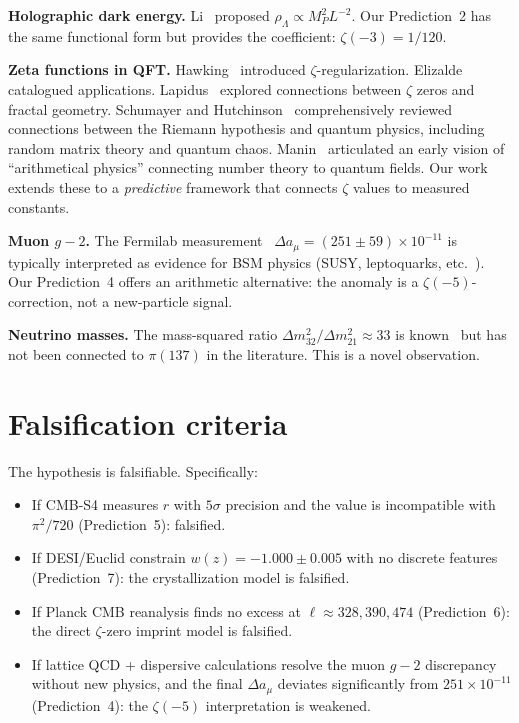 \documentclass[11pt,a4paper]{article}
\begin{document}
\textbf{Holographic dark energy.}
Li~\cite{Li2004} proposed $\rho_\Lambda \propto M_P^2 L^{-2}$.
Our Prediction~2 has the same functional form but provides
the coefficient: $\zeta(-3) = 1/120$.

\textbf{Zeta functions in QFT.}
Hawking~\cite{Hawking1977} introduced $\zeta$-regularization.
Elizalde~\cite{Elizalde2012} catalogued applications.
Lapidus~\cite{Lapidus2008} explored connections between
$\zeta$ zeros and fractal geometry.
Schumayer and Hutchinson~\cite{Schumayer2011} comprehensively
reviewed connections between the Riemann hypothesis and
quantum physics, including random matrix theory and quantum chaos.
Manin~\cite{Manin1989} articulated an early vision of
``arithmetical physics'' connecting number theory to quantum fields.
Our work extends these to a \emph{predictive} framework
that connects $\zeta$ values to measured constants.

\textbf{Muon $g-2$.}
The Fermilab measurement~\cite{Muong2_2021}
$\Delta a_\mu = (251 \pm 59) \times 10^{-11}$
is typically interpreted as evidence for BSM physics
(SUSY, leptoquarks, etc.~\cite{Athron2021}). Our Prediction~4
offers an arithmetic alternative: the anomaly is a
$\zeta(-5)$-correction, not a new-particle signal.

\textbf{Neutrino masses.}
The mass-squared ratio $\Delta m^2_{32}/\Delta m^2_{21} \approx 33$
is known~\cite{Esteban2020} but has not been connected to
$\pi(137)$ in the literature. This is a novel observation.

\section{Falsification criteria}
\label{sec:falsify}

The hypothesis is falsifiable. Specifically:
\begin{itemize}
\item If CMB-S4 measures $r$ with $5\sigma$ precision and
  the value is incompatible with $\pi^2/720$ (Prediction~5): falsified.
\item If DESI/Euclid constrain $w(z) = -1.000 \pm 0.005$ with no
  discrete features (Prediction~7): the crystallization model
  is falsified.
\item If Planck CMB reanalysis finds no excess at
  $\ell \approx 328, 390, 474$ (Prediction~6): the direct
  $\zeta$-zero imprint model is falsified.
\item If lattice QCD + dispersive calculations resolve the muon
  $g-2$ discrepancy without new physics, and the final $\Delta a_\mu$
  deviates significantly from $251 \times 10^{-11}$ (Prediction~4):
  the $\zeta(-5)$ interpretation is weakened.
\end{itemize}
\end{document}
